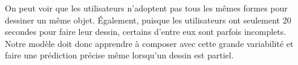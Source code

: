 On peut voir que les utilisateurs n'adoptent pas tous les mêmes formes pour dessiner un même objet. 
Également, puisque les utilisateurs ont seulement 20 secondes pour faire leur dessin, certains d'entre eux sont parfois incomplets.
Notre modèle doit donc apprendre à composer avec cette grande variabilité et faire une prédiction précise même lorsqu'un dessin est partiel.

